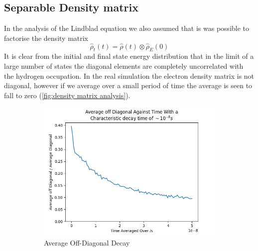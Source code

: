 \subsection{Separable Density matrix}
In the analysis of the Lindblad
equation we also assumed that is was possible
to factorise the density
matrix
\begin{equation}
    \hat{\rho}_t(t) = \hat{\rho}(t) \otimes \hat{\rho}_E(0)
\end{equation}
It is clear from the
initial and final
state energy distribution that
in the limit of a large
number of states the
diagonal elements are completely
uncorrelated with the
hydrogen occupation.
In the real simulation
the electron density
matrix is not diagonal,
however if we average
over a small period of time
the average is seen to
fall to zero
(\cref{fig:density matrix analysis}).
\begin{figure}[htbp]
    \centering
    \begin{subfigure}{0.45\linewidth}
        \centering
        \includegraphics[width =0.9 \linewidth]{Figures/Discussion/Off Diagonal Average Matrix Element Decay.png}
        \caption{Average Off-Diagonal Decay
        }\label{sub@fig:off diagonal matrix decay}
    \end{subfigure}
    \hfill
    \begin{subfigure}{0.45\linewidth}
        \centering

\end{subfigure}
\end{figure}
